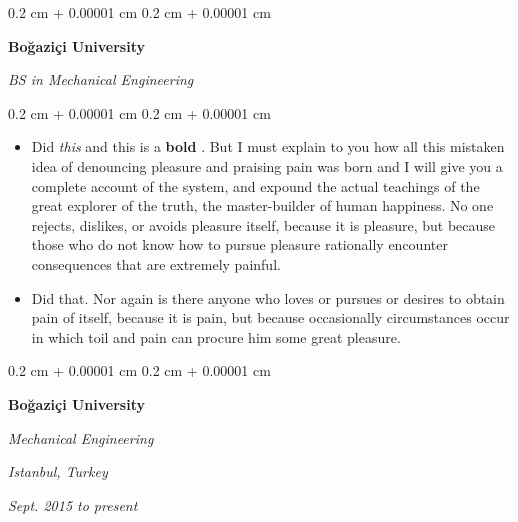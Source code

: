 \documentclass[10pt, letterpaper]{article}
\newenvironment{highlights}{
    \begin{itemize}[
        topsep=0.10 cm,
        parsep=0.10 cm,
        partopsep=0pt,
        itemsep=0pt,
        leftmargin=0.4 cm + 10pt + 0.6 cm
    ]
}{
    \end{itemize}
} %
\newenvironment{onecolentry}{
    \begin{adjustwidth}{
        0.2 cm + 0.00001 cm
    }{
        0.2 cm + 0.00001 cm
    }
}{
    \end{adjustwidth}
} %
\newenvironment{onecolentrybulleted}{
    \onecolentry
    \setcolumnwidth{0.6 cm, \fill}
    \begin{paracol}{2}
    \vspace*{\fill}
    \textbullet
    \vspace*{3px}
    \vspace*{\fill}
    \switchcolumn
}{
    \end{paracol}
    \endonecolentry
} %
\newenvironment{threecolentry}[3][]{
    \onecolentry
    \def\thirdColumn{#3}
    \setcolumnwidth{0.6 cm, \fill, 4.5 cm}
    \begin{paracol}{3}
    #2 \switchcolumn
}{
    \switchcolumn \raggedleft \thirdColumn
    \end{paracol}
    \endonecolentry
} %
\let\hrefWithoutArrow\href
\renewcommand{\href}[2]{\hrefWithoutArrow{#1}{\mbox{\ifthenelse{\equal{#2}{}}{ }{#2 }\raisebox{.15ex}{\footnotesize \faExternalLink*}}}}
\begin{document}
        \vspace{0.2 cm-3px}

        \begin{onecolentrybulleted}
            \textbf{Boğaziçi University}

            \textit{BS in Mechanical Engineering}
        \end{onecolentrybulleted}

        \vspace{0.10 cm-3px}
        \begin{onecolentry}
            \begin{highlights}
                \item Did \textit{this} and this is a \textbf{bold} \href{https://example.com}{link}. But I must explain to you how all this mistaken idea of denouncing pleasure and praising pain was born and I will give you a complete account of the system, and expound the actual teachings of the great explorer of the truth, the master-builder of human happiness. No one rejects, dislikes, or avoids pleasure itself, because it is pleasure, but because those who do not know how to pursue pleasure rationally encounter consequences that are extremely painful.
                \item Did that. Nor again is there anyone who loves or pursues or desires to obtain pain of itself, because it is pain, but because occasionally circumstances occur in which toil and pain can procure him some great pleasure.
            \end{highlights}
        \end{onecolentry}


        \vspace{0.2 cm-3px}

        \begin{threecolentry}{
            \vspace*{\fill}
            \textbullet
            \vspace*{3px}
            \vspace*{\fill}
        }{
        \textit{Istanbul, Turkey}    
            
        \textit{Sept. 2015 to present}}
            \textbf{Boğaziçi University}

            \textit{Mechanical Engineering}
        \end{threecolentry}



        \vspace{0.2 cm-3px}
\end{document}
